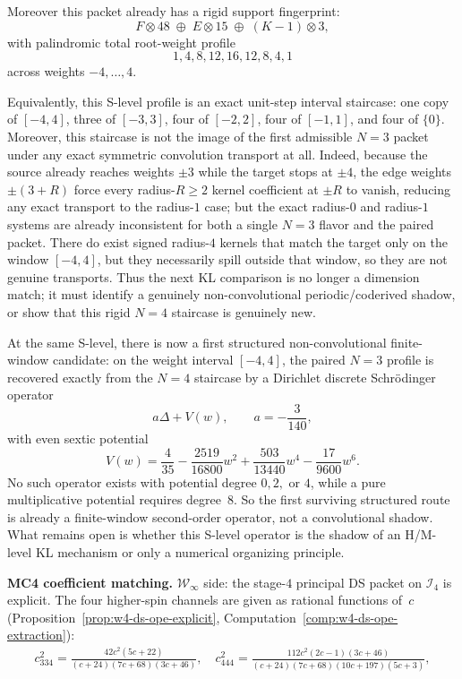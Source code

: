 \begin{remark}
Moreover this packet already has a rigid support fingerprint:
\[
F \otimes 48 \;\oplus\; E \otimes 15 \;\oplus\; (K-1)\otimes 3,
\]
with palindromic total root-weight profile
\[
1,4,8,12,16,12,8,4,1
\]
across weights $-4,\dots,4$.

Equivalently, this S-level profile is an
exact unit-step interval staircase: one copy of $[-4,4]$, three of
$[-3,3]$, four of $[-2,2]$, four of $[-1,1]$, and four of $\{0\}$.
Moreover, this staircase is not the image of the first admissible
$N=3$ packet under any exact symmetric convolution transport at all.
Indeed, because the source already reaches weights $\pm3$ while the
target stops at $\pm4$, the edge weights $\pm(3+R)$ force every
radius-$R\ge2$ kernel coefficient at $\pm R$ to vanish, reducing any
exact transport to the radius-$1$ case; but the exact radius-$0$ and
radius-$1$ systems are already inconsistent for both a single $N=3$
flavor and the paired packet.  There do exist signed radius-$4$
kernels that match the target only on the window $[-4,4]$, but they
necessarily spill outside that window, so they are not genuine
transports.  Thus the next KL comparison is no longer a dimension
match; it must identify a genuinely non-convolutional periodic/coderived
shadow, or show that this rigid $N=4$ staircase is genuinely new.

At the same S-level, there is now a first structured non-convolutional
finite-window candidate: on the weight interval $[-4,4]$, the paired
$N=3$ profile is recovered exactly from the $N=4$ staircase by a
Dirichlet discrete Schr\"odinger operator
\[
a\Delta + V(w),
\qquad
a = -\frac{3}{140},
\]
with even sextic potential
\[
V(w)=\frac{4}{35}
-\frac{2519}{16800}w^2
+\frac{503}{13440}w^4
-\frac{17}{9600}w^6.
\]
No such operator exists with potential degree $0,2,$ or $4$, while a
pure multiplicative potential requires degree~$8$.  So the first
surviving structured route is already a finite-window second-order
operator, not a convolutional shadow.  What remains open is whether
this S-level operator is the shadow of an H/M-level KL mechanism or
only a numerical organizing principle.

\smallskip\noindent
\textbf{MC4 coefficient matching.}
$\mathcal{W}_\infty$ side: the stage-$4$ principal DS packet on
$\mathcal{I}_4$ is explicit.  The four higher-spin channels are given
as rational functions of~$c$
(Proposition~\ref{prop:w4-ds-ope-explicit},
Computation~\ref{comp:w4-ds-ope-extraction}):
\begin{gather*}
c_{334}^2 = \frac{42c^2(5c+22)}{(c+24)(7c+68)(3c+46)},
\quad
c_{444}^2 = \frac{112c^2(2c-1)(3c+46)}{(c+24)(7c+68)(10c+197)(5c+3)},
\end{gather*}


\end{remark}
